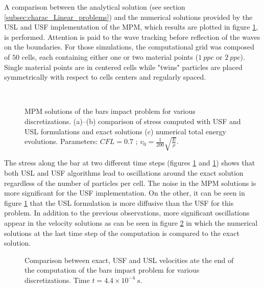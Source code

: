 A comparison between the analytical solution (see section \ref{subsec:charac_Linear_problems}) and the numerical solutions provided by the USL and USF implementation of the MPM, which results are plotted in figure \ref{fig:US_diffusion}, is performed. Attention is paid to the wave tracking before reflection of the waves on the boundaries. For those simulations, the computational grid was composed of $50$ cells, each containing either one or two material points ($1\: ppc$ or $2\: ppc$). Single material points are in centered cells while "twins" particles are placed symmetrically with respect to cells centers and regularly spaced. 
\begin{figure}[h!]
  \centering
  {  \label{subfig:US_diffusion_10}}
  {  \label{subfig:US_diffusion_25}}\\
  {  \label{subfig:US_energies}}
  \caption{MPM solutions of the bars impact problem for various discretizations. (a)--(b) comparison of stress computed with USF and USL formulations and exact solutions (c) numerical total energy evolutions. Parameters: $CFL=0.7$ ; $v_0=\frac{1}{200}\sqrt{\frac{E}{\rho}}$.}
  \label{fig:US_diffusion}
\end{figure}
The stress along the bar at two different time steps (figures \ref{fig:US_diffusion} and \ref{fig:US_diffusion}) shows that both USL and USF algorithms lead to oscillations around the exact solution regardless of the number of particles per cell. The noise in the MPM solutions is more significant for the USF implementation. On the other, it can be seen in figure \ref{fig:US_diffusion} that the USL formulation is more diffusive than the USF for this problem.  In addition to the previous observations, more significant oscillations appear in the velocity solutions as can be seen in figure \ref{fig:US_velocities} in which the numerical solutions at the last time step of the computation is compared to the exact solution. 
\begin{figure}[h!]
  \centering
  
  \caption{Comparison between exact, USF and USL velocities ate the end of the computation of the bars impact problem for various discretizations. Time $t=4.4 \times 10^{-4} \:s.$}
  \label{fig:US_velocities}
\end{figure}


